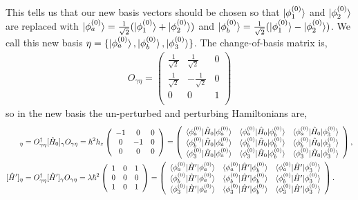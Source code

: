 \documentclass[10pt]{article}
\newcommand{\1}{\mathbf 1}
\begin{document}
This tells us that our new basis vectors should be chosen so that $\ket{\phi_1^{(0)}}$ and $\ket{\phi_2^{(0)}}$ are replaced with $\ket{\phi_a^{(0)}} = \frac{1}{\sqrt{2}}(\ket{\phi_1^{(0)}} + \ket{\phi_2^{(0)}})$ and $\ket{\phi_b^{(0)}} =  \frac{1}{\sqrt{2}}(\ket{\phi_1^{(0)}} - \ket{\phi_2^{(0)}})$.
We call this new basis $\eta = \{\ket{\phi_a^{(0)}}, \ket{\phi_b^{(0)}}, \ket{\phi_3^{(0)}}\}$.
The change-of-basis matrix is,
\begin{align}
	O_{\gamma \eta} = 
	\left(
		\begin{array}{ccc}
		 \frac{1}{\sqrt{2}} & \frac{1}{\sqrt{2}} & 0 \\
		 \frac{1}{\sqrt{2}} & -\frac{1}{\sqrt{2}} & 0 \\
		 0 & 0 & 1 \\
		\end{array}
		\right)
\end{align}
so in the new basis the un-perturbed and perturbing Hamiltonians are,
\begin{align}
	[\hat H_0]_\eta
	&=
	O_{\gamma\eta}^\dagger
	[\hat H_0]_\gamma
	O_{\gamma\eta}
	=
	\hbar^2 h_z
	\left(
\begin{array}{ccc}
 -1 & 0 & 0 \\
 0 & -1 & 0 \\
 0 & 0 & 0 \\
\end{array}
\right)
=
\left(
	\begin{array}{ccc}
		\braket{\phi_a^{(0)} | \hat H_0 | \phi_a^{(0)}}
		&
		\braket{\phi_a^{(0)} | \hat H_0 | \phi_b^{(0)}}
		&
		\braket{\phi_a^{(0)} | \hat H_0 | \phi_3^{(0)}}
		\\
		\braket{\phi_b^{(0)} | \hat H_0 | \phi_a^{(0)}}
		&
		\braket{\phi_b^{(0)} | \hat H_0 | \phi_b^{(0)}}
		&
		\braket{\phi_b^{(0)} | \hat H_0 | \phi_3^{(0)}}
		\\
		\braket{\phi_3^{(0)} | \hat H_0 | \phi_a^{(0)}}
		&
		\braket{\phi_3^{(0)} | \hat H_0 | \phi_b^{(0)}}
		&
		\braket{\phi_3^{(0)} | \hat H_0 | \phi_3^{(0)}}
		\\
	\end{array}
\right)
,
\\
[\hat H']_\eta
&=
O_{\gamma\eta}^\dagger
[\hat H']_\gamma
O_{\gamma\eta}
=
\lambda\hbar^2
\left(
\begin{array}{ccc}
 1 & 0 & 1 \\
 0 & 0 & 0 \\
 1 & 0 & 1 \\
\end{array}
\right)
=
\left(
	\begin{array}{ccc}
		\braket{\phi_a^{(0)} | \hat H' | \phi_a^{(0)}}
		&
		\braket{\phi_a^{(0)} | \hat H' | \phi_b^{(0)}}
		&
		\braket{\phi_a^{(0)} | \hat H' | \phi_3^{(0)}}
		\\
		\braket{\phi_b^{(0)} | \hat H' | \phi_a^{(0)}}
		&
		\braket{\phi_b^{(0)} | \hat H' | \phi_b^{(0)}}
		&
		\braket{\phi_b^{(0)} | \hat H' | \phi_3^{(0)}}
		\\
		\braket{\phi_3^{(0)} | \hat H' | \phi_a^{(0)}}
		&
		\braket{\phi_3^{(0)} | \hat H' | \phi_b^{(0)}}
		&
		\braket{\phi_3^{(0)} | \hat H' | \phi_3^{(0)}}
		\\
	\end{array}
\right).
\end{align}
\end{document}
